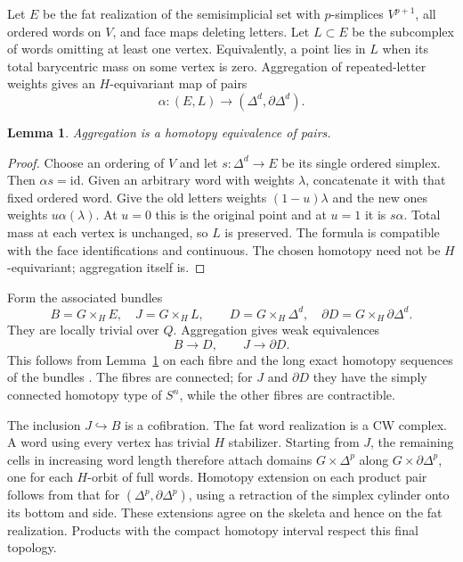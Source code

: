 \documentclass[11pt,a4paper]{article}
\newtheorem{lemma}[theorem]{Lemma}
\theoremstyle{definition}
\begin{document}
Let \(E\) be the fat realization of the semisimplicial set with \(p\)-simplices \(V^{p+1}\), all ordered words on \(V\), and face maps deleting letters. Let \(L\subset E\) be the subcomplex of words omitting at least one vertex. Equivalently, a point lies in \(L\) when its total barycentric mass on some vertex is zero.
Aggregation of repeated-letter weights gives an \(H\)-equivariant map of pairs
\[
\alpha:(E,L)\longrightarrow(\Delta^d,\partial\Delta^d).
\]

\begin{lemma}\label{lem:words}
Aggregation is a homotopy equivalence of pairs.
\end{lemma}
\begin{proof}
Choose an ordering of \(V\) and let \(s:\Delta^d\to E\) be its single ordered simplex. Then \(\alpha s=\mathrm{id}\).
Given an arbitrary word with weights \(\lambda\), concatenate it with that fixed ordered word. Give the old letters weights \((1-u)\lambda\) and the new ones weights \(u\alpha(\lambda)\). At \(u=0\) this is the original point and at \(u=1\) it is \(s\alpha\). Total mass at each vertex is unchanged, so \(L\) is preserved. The formula is compatible with the face identifications and continuous. The chosen homotopy need not be \(H\)-equivariant; aggregation itself is.
\end{proof}

Form the associated bundles
\[
B=G\times_H E,\quad J=G\times_H L,\qquad
D=G\times_H\Delta^d,\quad \partial D=G\times_H\partial\Delta^d.
\]
They are locally trivial over \(Q\). Aggregation gives weak equivalences
\[
B\longrightarrow D,\qquad J\longrightarrow\partial D.
\]
This follows from Lemma~\ref{lem:words} on each fibre and the long exact homotopy sequences of the bundles \cite[Theorem~4.41 and Proposition~4.48]{Hat}. The fibres are connected; for \(J\) and \(\partial D\) they have the simply connected homotopy type of \(S^n\), while the other fibres are contractible.

The inclusion \(J\hookrightarrow B\) is a cofibration. The fat word realization is a CW complex. A word using every vertex has trivial \(H\) stabilizer. Starting from \(J\), the remaining cells in increasing word length therefore attach domains \(G\times\Delta^p\) along \(G\times\partial\Delta^p\), one for each \(H\)-orbit of full words. Homotopy extension on each product pair follows from that for \((\Delta^p,\partial\Delta^p)\), using a retraction of the simplex cylinder onto its bottom and side. These extensions agree on the skeleta and hence on the fat realization. Products with the compact homotopy interval respect this final topology.
\end{document}
